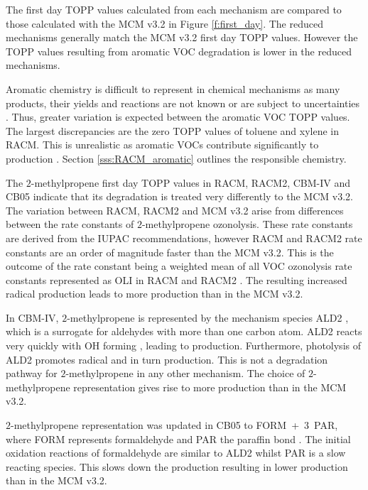 The first day TOPP values calculated from each mechanism are compared to those calculated with the MCM v3.{2} in Figure \ref{f:first_day}. 
The reduced mechanisms generally match the MCM v3.2 first day TOPP values. 
However the TOPP values resulting from aromatic VOC degradation is lower in the reduced mechanisms.

Aromatic chemistry is difficult to represent in chemical mechanisms as many products, their yields and reactions are not known or are subject to uncertainties \citep{Vereecken:2012}. 
Thus, greater variation is expected between the aromatic VOC TOPP values.
The largest discrepancies are the zero TOPP values of toluene and xylene in RACM. 
This is unrealistic as aromatic VOCs contribute significantly to  production \citep{Derwent:1998}. 
Section \ref{sss:RACM_aromatic} outlines the responsible chemistry.

The $2$-methylpropene first day TOPP values in RACM, RACM2, CBM-IV and CB05 indicate that its degradation is treated very differently to the MCM v3.2. 
The variation between RACM, RACM2 and MCM v3.2 arise from differences between the rate constants of $2$-methylpropene ozonolysis. 
These rate constants are derived from the IUPAC recommendations\citep{IUPAC_Site}, however RACM and RACM2 rate constants are an order of magnitude faster than the MCM v3.2.
This is the outcome of the rate constant being a weighted mean of all VOC ozonolysis rate constants represented as OLI in RACM and RACM2 \citep{Stockwell:1997, Goliff:2013}.
The resulting increased radical production leads to more  production than in the MCM v3.2.

In CBM-IV, $2$-methylpropene is represented by the mechanism species ALD2 \citep{Hogo:1989}, which is a surrogate for aldehydes with more than one carbon atom. 
ALD2 reacts very quickly with OH forming , leading to  production. 
Furthermore, photolysis of ALD2 promotes radical and in turn  production. 
This is not a degradation pathway for $2$-methylpropene in any other mechanism. 
The choice of $2$-methylpropene representation gives rise to more  production than in the MCM v3.2.

$2$-methylpropene representation was updated in CB05 to \mbox{FORM + $3$ PAR}, where FORM represents formaldehyde and PAR the paraffin  bond \citep{Yarwood:2005}. 
The initial oxidation reactions of formaldehyde are similar to ALD2 whilst PAR is a slow reacting species. 
This slows down the  production resulting in lower  production than in the MCM v3.2.

